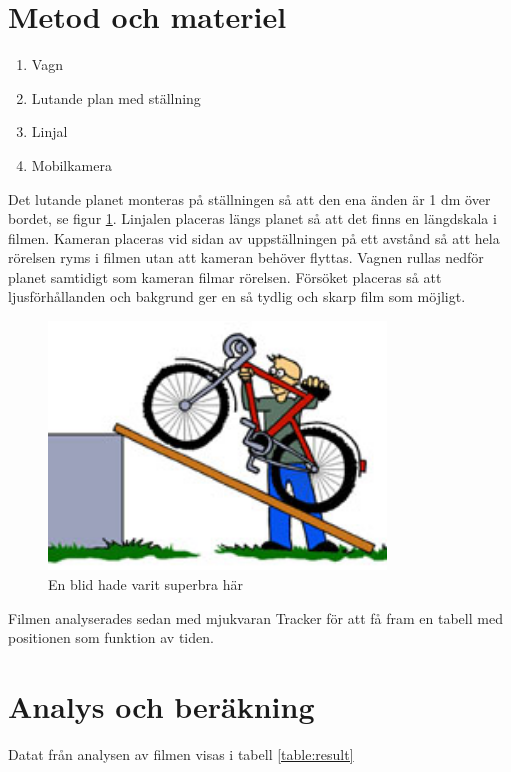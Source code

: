 \documentclass[11p, titlepage, oneside, a4paper]{article}
\begin{document}
	\section{Metod och materiel}
        \begin{enumerate}
            \item Vagn
            \item Lutande plan med ställning
            \item Linjal
            \item Mobilkamera
        \end{enumerate}
        
        Det lutande planet monteras på ställningen så att den ena änden är 1 dm över bordet, se figur \ref{fig:lutandeplan}. Linjalen placeras längs planet så att det finns en längdskala  i filmen. Kameran placeras vid sidan av uppställningen på ett avstånd så att hela rörelsen ryms i filmen utan att kameran behöver flyttas. Vagnen rullas nedför planet samtidigt som kameran filmar rörelsen. Försöket placeras så att ljusförhållanden och bakgrund ger en så tydlig och skarp film som möjligt.
        
        \begin{figure}[!h]
            \includegraphics[width=0.8\textwidth]{images/lutandePlan.jpg}
            \caption{En blid hade varit superbra här}
            \label{fig:lutandeplan}
        \end{figure}
        
        Filmen analyserades sedan med mjukvaran Tracker för att få fram en tabell med positionen som funktion av tiden.
    \newpage
	\section{Analys och beräkning}
        Datat från analysen av filmen visas i tabell \ref{table:result}
\end{document}
